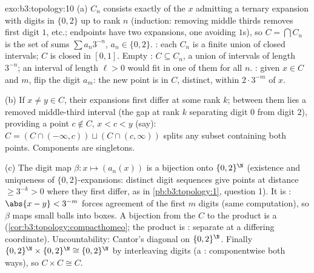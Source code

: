 \begin{solution}{exo:b3:topology:10}
(a) $C_n$ consists exactly of the $x$ admitting a ternary
expansion with digits in $\{0, 2\}$ up to rank $n$ (induction:
removing middle thirds removes first digit $1$, etc.; endpoints
have two expansions, one avoiding $1$s), so $C = \bigcap C_n$
is the set of sums $\sum a_n3^{-n}$, $a_n \in \{0,2\}$. :
each $C_n$ is a finite union of closed intervals; $C$ is closed
in $[0,1]$. Empty : $C \subseteq C_n$, a union of
intervals of length $3^{-n}$; an  interval of length
$\ell > 0$ would fit in one of them for all $n$. : given
$x \in C$ and $m$, flip the digit $a_m$: the new point is in
$C$, distinct, within $2\cdot3^{-m}$ of $x$.

(b) If $x \neq y \in C$, their expansions first differ at some
rank $k$; between them lies a removed middle-third interval
(the gap at rank $k$ separating digit $0$ from digit $2$),
providing a point $c \notin C$, $x < c < y$ (say): $C =
(C \cap (-\infty, c)) \sqcup (C \cap (c, \infty))$ splits any
subset containing both points. Components are singletons.

(c) The digit map $\beta\colon x \mapsto (a_n(x))$ is a
bijection onto $\{0,2\}^\N$ (existence and uniqueness of
$\{0,2\}$-expansions: distinct digit sequences give points at
distance $\geq 3^{-k} > 0$ where they first differ, as in
\cref{pb:b3:topology:1}, question 1). It is :
$\abs{x - y} < 3^{-m}$ forces agreement of the first $m$ digits
(same computation), so $\beta$ maps small balls into 
boxes. A  bijection from the  $C$ to the
 product is a 
(\cref{cor:b3:topology:compacthomeo}; the product is :
separate at a differing coordinate). Uncountability: Cantor's
diagonal on $\{0,2\}^\N$. Finally $\{0,2\}^\N \times
\{0,2\}^\N \cong \{0,2\}^\N$ by interleaving digits (a
: componentwise  both ways), so $C
\times C \cong C$.
\end{solution}

